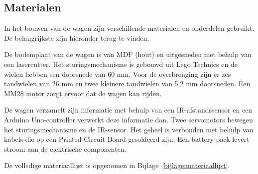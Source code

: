 \subsection{Materialen}
In het bouwen van de wagen zijn verschillende materialen en onderdelen gebruikt. De belangrijkste zijn hieronder terug te vinden.

De bodemplaat van de wagen is van MDF (hout) en uitgesneden met behulp van een lasercutter. Het sturingsmechanisme is gebouwd uit Lego Technics en de  wielen hebben een doorsnede van 60 mm. Voor de overbrenging zijn er zes tandwielen van 26 mm en twee kleinere tandwielen van 5,2 mm doorsneden.
Een MM28 motor zorgt ervoor dat de wagen kan rijden. 

De wagen verzamelt zijn informatie met behulp van een IR-afstandssensor en een Arduino Uno-controller verwerkt deze informatie dan. Twee servomotors bewegen het sturingsmechanisme en de IR-sensor. Het geheel is verbonden met behulp van kabels die op een Printed Circuit Board gesoldeerd zijn. Een battery pack levert stroom aan de elektrische componenten. 

De volledige materiaallijst is opgenomen in Bijlage~\ref{bijlage:materiaallijst}. 

